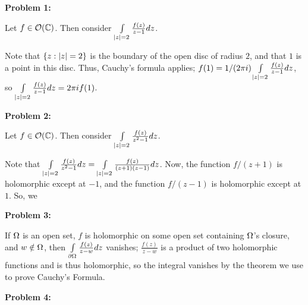 \documentclass[a4paper,12pt]{article}
\begin{document}
{\bf Problem 1:}

Let $f \in \mathcal{O}(\mathbb{C})$. Then consider $\int\limits_{\left\lvert z \right\rvert = 2} \frac{f(z)}{z-1} dz$.

Note that $\{z: \left\lvert z \right\rvert=2\}$ is the boundary of the open disc of radius $2$, and that $1$ is a point in this disc. Thus, Cauchy's formula applies; $f(1) = 1/(2\pi i)  \int\limits_{\left\lvert z \right\rvert = 2} \frac{f(z)}{z-1} dz$, so $\int\limits_{\left\lvert z \right\rvert = 2} \frac{f(z)}{z-1} dz = 2 \pi i f(1)$.

\shunt

{\bf Problem 2:}

Let $f \in \mathcal{O}(\mathbb{C})$. Then consider $\int\limits_{\left\lvert z \right\rvert = 2} \frac{f(z)}{z^2-1} dz$.

Note that $\int\limits_{\left\lvert z \right\rvert = 2} \frac{f(z)}{z^2-1} dz = \int\limits_{\left\lvert z \right\rvert = 2} \frac{f(z)}{(z+1)(z-1)} dz$. Now, the function $f/(z+1)$ is holomorphic except at $-1$, and the function $f/(z-1)$ is holomorphic except at $1$. So, we %

\shunt

{\bf Problem 3:}

If $\Omega$ is an open set, $f$ is holomorphic on some open set containing $\Omega$'s closure, and $w \notin \Omega$, then $ \int\limits_{\partial \Omega} \frac{f(z)}{z-w} dz$ vanishes; $\frac{f(z)}{z-w}$ is a product of two holomorphic functions and is thus holomorphic, so the integral vanishes by the theorem we use to prove Cauchy's Formula.

\shunt

{\bf Problem 4:}


\shunt
\end{document}
